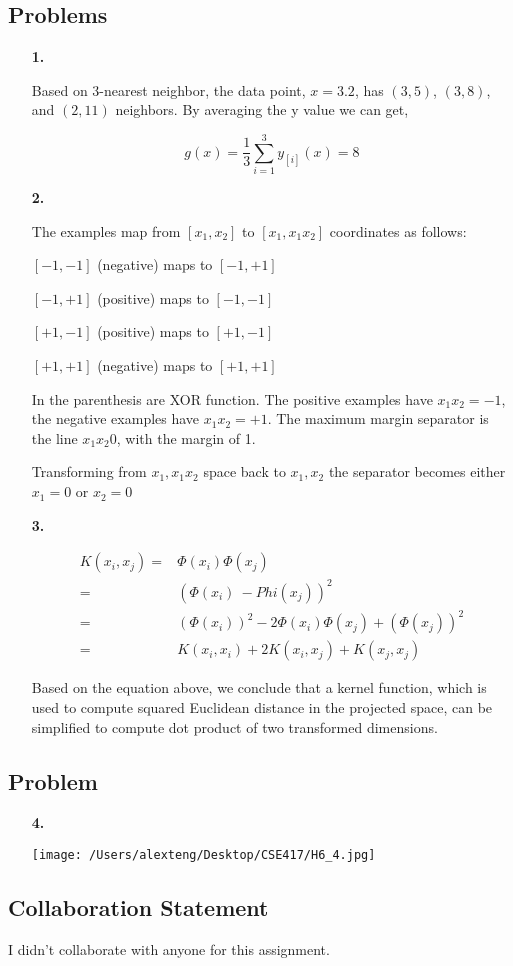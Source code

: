 \documentclass[11pt]{article}
\begin{document}
\subsection * {Problems}

\begin{enumerate}

\item [\textbf{1.}]  

Based on 3-nearest neighbor, the data point, $x = 3.2$, has $(3,5)$, $(3,8)$, and $(2,11)$ neighbors. By averaging the y value we can get, 

$$ g(x) = \frac{1}{3}\sum_{i=1}^{3}y_{[i]}(x) = 8$$


\item[\textbf{2.}]

The examples map from $[x_1, x_2]$ to $[x_1, x_1x_2]$ coordinates as follows:

$[-1, -1]$ (negative) maps to $[-1, +1]$

$[-1, +1]$ (positive) maps to $[-1, -1]$

$[+1, -1]$ (positive) maps to $[+1, -1]$

$[+1, +1]$ (negative) maps to $[+1, +1]$

In the parenthesis are XOR function. The positive examples have $x_1x_2 = -1$, the negative examples have $x_1x_2 = +1$. The maximum margin separator is the line $x_1x_2 0$, with the margin of 1. 

Transforming from $x_1, x_1x_2$ space back to $x_1, x_2$ the separator becomes either $x_1 = 0$ or $x_2 = 0$


\item[\textbf{3.}]

\begin{equation}
\begin{aligned}
K(x_i, x_j) =& \Phi(x_i)\Phi(x_j) \\
=& (\Phi(x_i)\ - Phi(x_j))^2\\
=& (\Phi(x_i))^2 - 2\Phi(x_i)\Phi(x_j)  + (\Phi(x_j))^2\\
=& K(x_i,x_i) + 2K(x_i,x_j) + K(x_j,x_j)
\end{aligned}
\end{equation}

Based on the equation above, we conclude that a kernel function, which is used to compute squared Euclidean distance in the projected space, can be simplified to compute dot product of two transformed dimensions. 

\end{enumerate}

\subsection*{Problem}
\begin{enumerate}

\item[\textbf{4.}]

\texttt{[image: /Users/alexteng/Desktop/CSE417/H6\_4.jpg]}





\end{enumerate}
\pagebreak


\subsection*{Collaboration Statement}

I didn't collaborate with anyone for this assignment.
\end{document}
